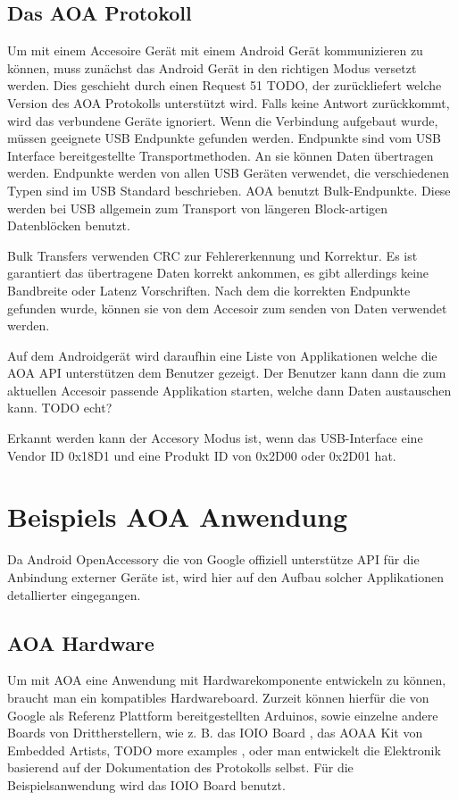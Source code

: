 \documentclass[12pt,journal,compsoc]{IEEEtran}
\begin{document}
\subsection{Das AOA Protokoll}
Um mit einem Accesoire Gerät mit einem Android Gerät kommunizieren zu können, muss zunächst das Android Gerät in den richtigen Modus versetzt werden.
Dies geschieht durch einen Request 51 TODO, der zurückliefert welche Version des AOA Protokolls unterstützt wird. Falls keine Antwort zurückkommt, wird das verbundene Geräte ignoriert.
Wenn die Verbindung aufgebaut wurde, müssen geeignete USB Endpunkte gefunden werden. Endpunkte sind vom USB Interface bereitgestellte Transportmethoden. An sie können Daten übertragen werden.
Endpunkte werden von allen USB Geräten verwendet, die verschiedenen Typen sind im USB Standard beschrieben.
AOA benutzt Bulk-Endpunkte. Diese werden bei USB allgemein zum Transport von längeren Block-artigen Datenblöcken benutzt.

Bulk Transfers verwenden CRC zur Fehlererkennung und Korrektur. Es ist garantiert das übertragene Daten korrekt ankommen, es gibt allerdings keine Bandbreite oder Latenz Vorschriften.
\cite{usbbulk}
Nach dem die korrekten Endpunkte gefunden wurde, können sie von dem Accesoir zum senden von Daten verwendet werden.

Auf dem Androidgerät wird daraufhin eine Liste von Applikationen welche die AOA API unterstützen dem Benutzer gezeigt. Der Benutzer kann dann die zum aktuellen Accesoir passende Applikation starten, welche dann Daten austauschen kann. TODO echt?


Erkannt werden kann der Accesory Modus ist, wenn das USB-Interface eine Vendor ID 0x18D1 und eine Produkt ID von 0x2D00 oder 0x2D01 hat. 

\section{Beispiels AOA Anwendung}
Da Android OpenAccessory die von Google offiziell unterstütze API für die Anbindung externer Geräte ist, wird hier auf den Aufbau solcher Applikationen detallierter eingegangen.
\subsection{AOA Hardware}
Um mit AOA eine Anwendung mit Hardwarekomponente entwickeln zu können, braucht man ein kompatibles Hardwareboard.
Zurzeit können hierfür die von Google als Referenz Plattform bereitgestellten Arduinos, sowie einzelne andere Boards von Drittherstellern, wie z. B. das IOIO Board \cite{ioio}, das AOAA Kit von Embedded Artists\cite{aoaa},  TODO more examples , oder man entwickelt die Elektronik basierend auf der Dokumentation des Protokolls selbst\cite{aoaprotocol2}.
Für die Beispielsanwendung wird das IOIO Board benutzt.
\end{document}
